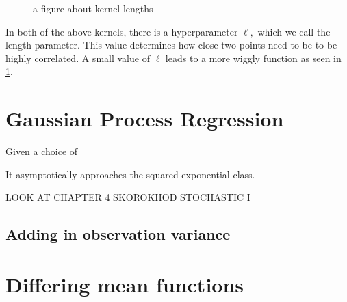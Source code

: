 \begin{figure}
    \caption{a figure about kernel lengths}
    \label{fig:no_reg_lengths}
\end{figure}

In both of the above kernels, there is a hyperparameter $\ell,$ which we call the length parameter. This value determines how close two points need to be to be highly correlated. A small value of $\ell$ leads to a more wiggly function as seen in \ref{fig:no_reg_lengths}. 

\section{Gaussian Process Regression}

Given a choice of


\begin{figure}
\end{figure}


\begin{figure}
\end{figure}

It asymptotically approaches the squared exponential class.

LOOK AT CHAPTER 4 SKOROKHOD STOCHASTIC I

\subsection*{Adding in observation variance}

\begin{figure}
\end{figure}

\section{Differing mean functions}


\begin{figure}
\end{figure}